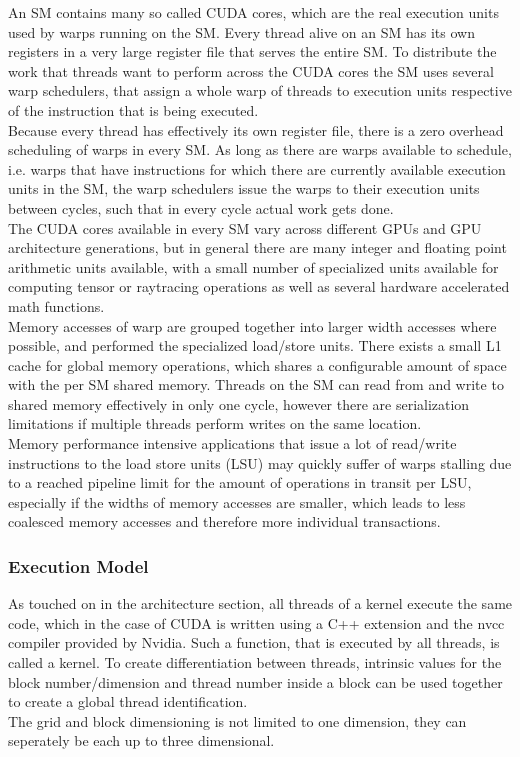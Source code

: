 \documentclass{tudscrreprt}
\begin{document}
				An SM contains many so called CUDA cores, which are the real execution units used by warps running on the SM. Every thread alive on an SM has its own registers in a very large register file that serves the entire SM. To distribute the work that threads want to perform across the CUDA cores the SM uses several warp schedulers, that assign a whole warp of threads to execution units respective of the instruction that is being executed. \\
				Because every thread has effectively its own register file, there is a zero overhead scheduling of warps in every SM. As long as there are warps available to schedule, i.e. warps that have instructions for which there are currently available execution units in the SM, the warp schedulers issue the warps to their execution units between cycles, such that in every cycle actual work gets done. \\
				
				The CUDA cores available in every SM vary across different GPUs and GPU architecture generations, but in general there are many integer and floating point arithmetic units available, with a small number of specialized units available for computing tensor or raytracing operations as well as several hardware accelerated math functions. \\
				
				Memory accesses of warp are grouped together into larger width accesses where possible, and performed the specialized load/store units. There exists a small L1 cache for global memory operations, which shares a configurable amount of space with the per SM shared memory. Threads on the SM can read from and write to shared memory effectively in only one cycle, however there are serialization limitations if multiple threads perform writes on the same location. \\
				Memory performance intensive applications that issue a lot of read/write instructions to the load store units (LSU) may quickly suffer of warps stalling due to a reached pipeline limit for the amount of operations in transit per LSU, especially if the widths of memory accesses are smaller, which leads to less coalesced memory accesses and therefore more individual transactions. \\
			
			\subsubsection{Execution Model}
				As touched on in the architecture section, all threads of a kernel execute the same code, which in the case of CUDA is written using a C++ extension and the nvcc compiler provided by Nvidia. Such a function, that is executed by all threads, is called a kernel. To create differentiation between threads, intrinsic values for the block number/dimension and thread number inside a block can be used together to create a global thread identification. \\
				The grid and block dimensioning is not limited to one dimension, they can seperately be each up to three dimensional. \\
				
\end{document}
